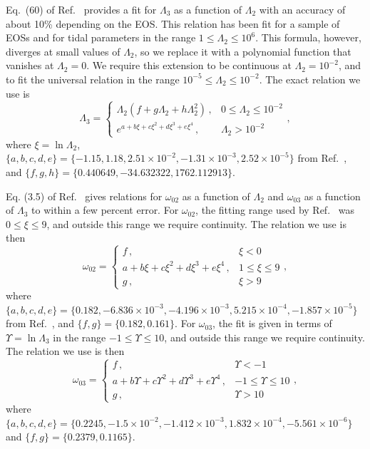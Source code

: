 \documentclass[prd,aps,letter,twocolumn,floatfix,notitlepage,nofootinbib]{revtex4-1}
\begin{document}
Eq.~(60) of Ref.~\cite{Yagi:2013sva} provides a fit for $\Lambda_3$ as a function of $\Lambda_2$ with an accuracy of about 10\% depending on the EOS. This relation has been fit for a sample of EOSs and for tidal parameters in the range $1 \leq \Lambda_2\leq10^6$. This formula, however, diverges at small values of $\Lambda_2$, so we replace it with a polynomial function that vanishes at $\Lambda_2 = 0$. We require this extension to be continuous at $\Lambda_2 = 10^{-2}$, and to fit the universal relation in the range $10^{-5}\leq\Lambda_2\leq10^{-2}$. The exact relation we use is
\begin{equation}
\Lambda_3 = \left\{\begin{array}{ll}
\Lambda_2 (f + g \Lambda_2 + h \Lambda_2^2)\, , & 0 \leq \Lambda_2 \leq 10^{-2} \\
e^{a + b \xi + c \xi^2 + d \xi^3 + e \xi^4}\, , & \Lambda_2>10^{-2}
\end{array}\right.,
\end{equation}
where $\xi = \ln\Lambda_2$, $\{a, b, c, d, e\} = \{-1.15, 1.18, 2.51\times 10^{-2}, -1.31\times 10^{-3}, 2.52\times 10^{-5}\}$ from Ref.~\cite{Yagi:2013sva}, and $\{f, g, h\}=\{0.440649, -34.632322, 1762.112913\}$.

Eq. (3.5) of Ref.~\cite{Chan:2014kua} gives relations for $\omega_{02}$ as a function of $\Lambda_2$ and $\omega_{03}$ as a function of $\Lambda_3$ to within a few percent error. For $\omega_{02}$, the fitting range used by Ref.~\cite{Chan:2014kua} was $0\leq \xi \leq 9$, and outside this range we require continuity. The relation we use is then
\begin{equation}
\omega_{02} = \left\{\begin{array}{ll}
f\, , & \xi < 0 \\
a + b\xi + c\xi^2 + d\xi^3 + e\xi^4\, , & 1 \le \xi \le 9 \\
g\, , & \xi > 9
\end{array}\right.,
\end{equation}
where $\{a, b, c, d, e\} = \{0.182, -6.836\times10^{-3}, -4.196\times10^{-3}, 5.215\times10^{-4}, -1.857\times10^{-5}\}$ from Ref.~\cite{Chan:2014kua}, and $\{f, g\}=\{0.182, 0.161\}$. For $\omega_{03}$, the fit is given in terms of $\Upsilon=\ln\Lambda_3$ in the range $-1\leq \Upsilon \leq 10$, and outside this range we require continuity. The relation we use is then
\begin{equation}
\omega_{03} = \left\{\begin{array}{ll}
f\, , & \Upsilon < -1 \\
a + b\Upsilon + c\Upsilon^2 + d\Upsilon^3 + e\Upsilon^4\, , & -1 \le \Upsilon \le 10 \\
g\, , & \Upsilon > 10
\end{array}\right.,
\end{equation}
where $\{a, b, c, d, e\} = \{0.2245, -1.5\times10^{-2}, -1.412\times10^{-3}, 1.832\times10^{-4}, -5.561\times10^{-6}\}$ and $\{f, g\}=\{0.2379, 0.1165\}$.
\end{document}
